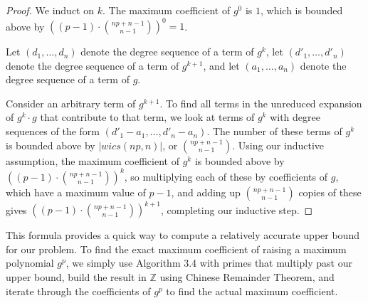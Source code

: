 \begin{proof}
    We induct on $k$. The maximum coefficient of $g^0$ is $1$, which is bounded above by $((p - 1) \cdot \binom{np + n - 1}{n - 1}) ^ 0 = 1$.
    
    Let $(d_1, \dots , d_n)$ denote the degree sequence of a term of $g^k$, let $(d'_1, \dots , d'_n)$ denote the degree sequence of a term of $g^{k + 1}$, and let $(a_1, \dots , a_n)$ denote the degree sequence of a term of $g$.

    Consider an arbitrary term of $g^{k + 1}$. To find all terms in the unreduced expansion of $g^k \cdot g$ that contribute to that term, we look at terms of $g^k$ with degree sequences of the form $(d'_1 - a_1, \dots , d'_n - a_n)$. The number of these terms of $g^k$ is bounded above by $|wics(np, n)|$, or $\binom{np + n - 1}{n - 1}$. Using our inductive assumption, the maximum coefficient of $g^k$ is bounded above by $((p - 1) \cdot \binom{np + n - 1}{n - 1}) ^ k$, so multiplying each of these by coefficients of $g$, which have a maximum value of $p - 1$, and adding up $\binom{np + n - 1}{n - 1}$ copies of these gives $((p - 1) \cdot \binom{np + n - 1}{n - 1}) ^ {k + 1}$, completing our inductive step.
\end{proof}

This formula provides a quick way to compute a relatively accurate upper bound for our problem. To find the exact maximum coefficient of raising a maximum polynomial $g ^ p$, we simply use Algorithm 3.4 with primes that multiply past our upper bound, build the result in $\mathbb{Z}$ using Chinese Remainder Theorem, and iterate through the coefficients of $g^p$ to find the actual maximum coefficient.




